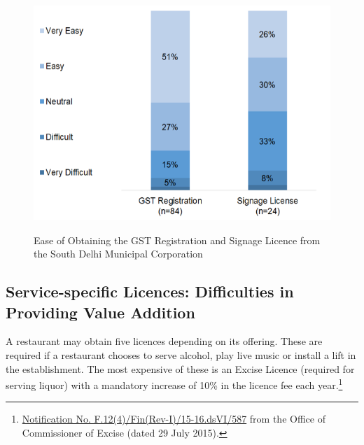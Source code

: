\documentclass[a4paper, 12pt]{article}
\begin{document}
		\begin{figure}[H]
                    	\centering
                    	\includegraphics[height = 3.5in]{Figure3.png}
                    	\caption[Optional Caption]{Ease of Obtaining the GST Registration and Signage Licence from the South Delhi Municipal Corporation}
		\end{figure}
		
		\subsection{Service-specific Licences: Difficulties in Providing Value Addition}
		
		A restaurant may obtain five licences depending on its offering. These are required if a restaurant chooses to serve alcohol, play live music or install a lift in the establishment. The most expensive of these is an Excise Licence (required for serving liquor) 
with a mandatory increase of 10\% in the licence fee each year.\footnote{\href{https://bit.ly/2xoejoG}{Notification No. F.12(4)/Fin(Rev-I)/15-16.dsVI/587} from the Office of Commissioner of Excise (dated 29 July 2015).}
		
		
\end{document}
